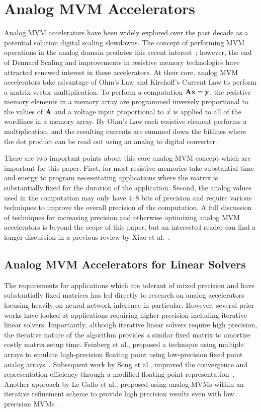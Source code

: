 \section{Analog MVM Accelerators}
Analog MVM accelerators have been widely explored over the past decade as a potential solution digital scaling slowdowns.
The concept of performing MVM operations in the analog domain predates this recent interest~\cite{Genov01}; however, the end of Dennard Scaling and improvements in resistive memory technologies have attracted renewed interest in these accelerators.
At their core, analog MVM accelerators take advantage of Ohm's Law and Kirchoff's Current Law to perform a matrix vector multiplication.
To perform a computation $\mathbf{A}\mathbf{x} = \mathbf{y}$, the resistive memory elements in a memory array are programmed inversely proportional to the values of $\mathbf{A}$ and a voltage input proportional to $\vec{x}$ is applied to all of the wordlines in a memory array.
By Ohm's Law each resistive element performs a multiplication, and the resulting currents are summed down the bitlines where the dot product can be read out using an analog to digital converter.

There are two important points about this core analog MVM concept which are important for this paper.
First, for most resistive memories take substantial time and energy to program necessitating applications where the matrix is substantially fixed for the duration of the application.
Second, the analog values used in the computation may only have 4--8 bits of precision and require various techniques to improve the overall precision of the computation.
A full discussion of techniques for increasing precision and otherwise optimizing analog MVM accelerators is beyond the scope of this paper, but an interested reader can find a longer discussion in a previous review by Xiao et al.~\cite{AnalogReview}.

\subsection{Analog MVM Accelerators for Linear Solvers}
The requirements for applications which are tolerant of mixed precision and have substantially fixed matrices has led directly to research on analog accelerators focusing heavily on neural network inference in particular.
However, several prior works have looked at applications requiring higher precision including iterative linear solvers.
Importantly, although iterative linear solvers require high precision, the iterative nature of the algorithm provides a similar fixed matrix to amortize costly matrix setup time.
Feinberg et al., proposed a technique using multiple arrays to emulate high-precision floating point using low-precision fixed point analog arrays~\cite{8416841}.
Subsequent work by Song et al., improved the convergence and representation efficiency through a modified floating point representation~\cite{10.1145/3581784.3607077}.
Another approach by Le Gallo et al., proposed using analog MVMs within an iterative refinement scheme to provide high precision results even with low precision MVMs~\cite{LeGallo2017MixedprecisionIC}.


